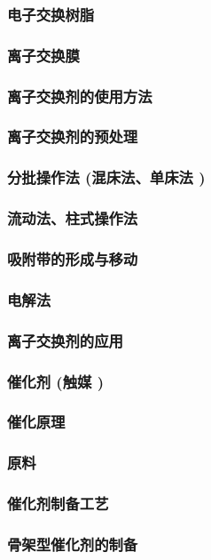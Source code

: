 \documentclass[UTF8]{../../ApplicationUniverse}
\begin{document}
            \subsubsection{电子交换树脂}
            \subsubsection{离子交换膜}
    \subsubsection{离子交换剂的使用方法}
        \subsubsection{离子交换剂的预处理}
        \subsubsection{分批操作法 (混床法、单床法 )}
        \subsubsection{流动法、柱式操作法}
        \subsubsection{吸附带的形成与移动}
        \subsubsection{电解法}
    \subsubsection{离子交换剂的应用}
\subsubsection{催化剂 (触媒 )}
    \subsubsection{催化原理}
    \subsubsection{原料}
    \subsubsection{催化剂制备工艺}
        \subsubsection{骨架型催化剂的制备}
\end{document}
